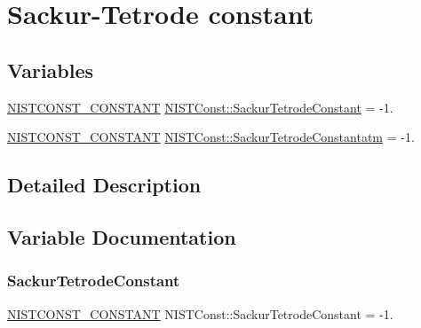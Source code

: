 \hypertarget{group___n_i_s_t_const-_sackur_tetrode_constant}{}\section{Sackur-\/\+Tetrode constant}
\label{group___n_i_s_t_const-_sackur_tetrode_constant}
\subsection*{Variables}
\begin{DoxyCompactItemize}
\item 
\mbox{\hyperlink{_n_i_s_t_const_8hpp_a2b0fc1d7452373f816175dd86ce26729}{N\+I\+S\+T\+C\+O\+N\+S\+T\+\_\+\+C\+O\+N\+S\+T\+A\+NT}} \mbox{\hyperlink{group___n_i_s_t_const-_sackur_tetrode_constant_ga855d127fef012cffe2ffe38cdb1b61fa}{N\+I\+S\+T\+Const\+::\+Sackur\+Tetrode\+Constant}} = -\/1.
\item 
\mbox{\hyperlink{_n_i_s_t_const_8hpp_a2b0fc1d7452373f816175dd86ce26729}{N\+I\+S\+T\+C\+O\+N\+S\+T\+\_\+\+C\+O\+N\+S\+T\+A\+NT}} \mbox{\hyperlink{group___n_i_s_t_const-_sackur_tetrode_constant_ga7f3efde326ea5cfe5e2d85d81a92fb3b}{N\+I\+S\+T\+Const\+::\+Sackur\+Tetrode\+Constantatm}} = -\/1.
\end{DoxyCompactItemize}


\subsection{Detailed Description}


\subsection{Variable Documentation}
\mbox{\label{group___n_i_s_t_const-_sackur_tetrode_constant_ga855d127fef012cffe2ffe38cdb1b61fa}} 
\subsubsection{\texorpdfstring{Sackur\+Tetrode\+Constant}{SackurTetrodeConstant}}
{\footnotesize\ttfamily \mbox{\hyperlink{_n_i_s_t_const_8hpp_a2b0fc1d7452373f816175dd86ce26729}{N\+I\+S\+T\+C\+O\+N\+S\+T\+\_\+\+C\+O\+N\+S\+T\+A\+NT}} N\+I\+S\+T\+Const\+::\+Sackur\+Tetrode\+Constant = -\/1.}

